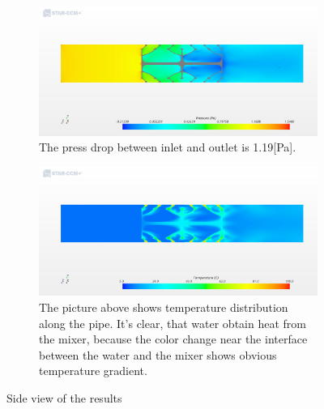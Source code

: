 \documentclass[journal,article,processes,submit,moreauthors,pdftex]{Definitions/mdpi}
\begin{document}
\begin{figure}
\begin{center}
\centering
\begin{subfigure}[b]{1.0\textwidth}
\includegraphics[width=\linewidth]{./docu_pictures/result1.png}
\caption*{The press drop between inlet and outlet is 1.19[Pa]. \\ \vspace{1cm}}
\end{subfigure}
\begin{subfigure}[b]{1.0\textwidth}
\includegraphics[width=\linewidth]{./docu_pictures/result2.png}
\caption*{The picture above shows temperature distribution along the pipe. It's clear, that water obtain heat from the mixer, because the color change near the interface between the water and the mixer shows obvious temperature gradient. \\ \vspace{1cm}}
\end{subfigure}
\end{center}
\caption{Side view of the results}
\label{vertical-result-pictures}
\end{figure}
\end{document}

